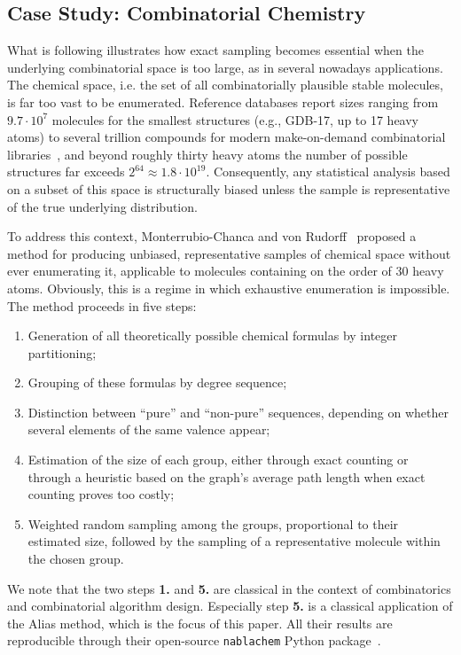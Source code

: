 \subsection{Case Study: Combinatorial Chemistry}
\label{sec:chemie}

What is following illustrates how exact sampling becomes essential
when the underlying combinatorial space is too large, as in several nowadays applications.
The chemical space, i.e. the set of all combinatorially plausible stable
molecules, is far too vast to be enumerated. Reference databases report
sizes ranging from $9.7 \cdot 10^{7}$ molecules for the smallest
structures (e.g., GDB-17, up to 17 heavy atoms) to several trillion
compounds for modern make-on-demand combinatorial
libraries~\cite{SSHL26}, and beyond roughly thirty heavy atoms the
number of possible structures far exceeds $2^{64} \approx 1.8 \cdot
10^{19}$. Consequently, any statistical analysis based on a subset of this
space is structurally biased unless the sample is representative of the
true underlying distribution.

To address this context, Monterrubio-Chanca and von Rudorff~\cite{MR25}
proposed a method for producing unbiased, representative samples of
chemical space without ever enumerating it, applicable to molecules containing
on the order of 30 heavy atoms. Obviously, this is a regime in which exhaustive enumeration is
impossible. The method proceeds in five steps:
\begin{enumerate}
  \item Generation of all theoretically possible chemical formulas by
    integer partitioning; %
  \item Grouping of these formulas by degree sequence;
  \item Distinction between ``pure'' and ``non-pure'' sequences, depending
    on whether several elements of the same valence appear;
  \item Estimation of the size of each group, either through exact
    counting or through a heuristic based on the graph's average path length when
    exact counting proves too costly;
  \item Weighted random sampling among the groups, proportional to their
    estimated size, followed by the sampling of a representative molecule
    within the chosen group.
\end{enumerate}
We note that the two steps \textbf{1.} and \textbf{5.} are classical in the context of combinatorics and combinatorial
algorithm design. Especially step \textbf{5.} is a classical application of the Alias method, which is the focus of this paper.
All their results are reproducible through their open-source \texttt{nablachem} Python
package~\cite{nablachem}.

